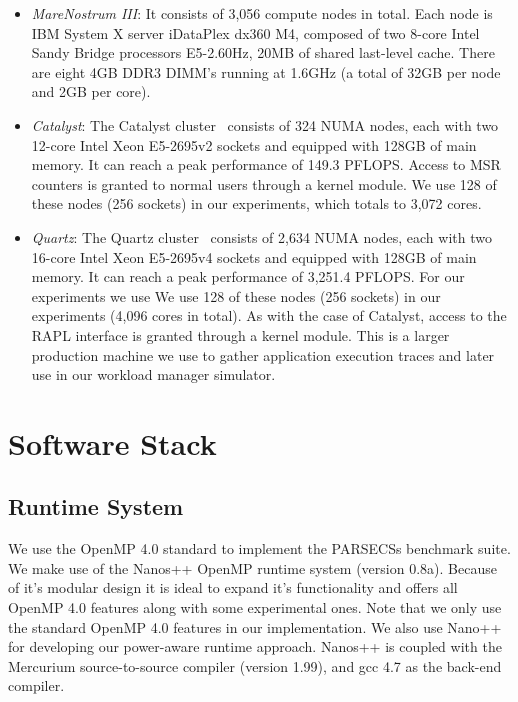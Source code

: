 \begin{itemize}
	\item \emph{MareNostrum III}: It consists of 3,056 compute nodes in total. Each node is
IBM System X server iDataPlex dx360 M4, composed of two 8-core Intel Sandy Bridge
processors E5-2.60Hz, 20MB of shared last-level cache. There are eight 4GB DDR3 DIMM's
running at 1.6GHz (a total of 32GB per node and 2GB per core). 

	\item \emph{Catalyst}: The Catalyst cluster~\cite{llnlconfluence} consists of 324 NUMA
nodes, each with two 12-core Intel Xeon E5-2695v2 sockets and equipped with 128GB of main
memory.  It can reach a peak performance of 149.3 PFLOPS.  Access to MSR counters is
granted to normal users through a kernel module.  We use 128 of these nodes (256 sockets)
in our experiments, which totals to 3,072 cores.

	\item \emph{Quartz}: The Quartz cluster~\cite{llnlconfluence} consists of 2,634 NUMA
nodes, each with two 16-core Intel Xeon E5-2695v4 sockets and equipped with 128GB of main
memory.  It can reach a peak performance of 3,251.4 PFLOPS.  For our experiments we use We
use 128 of these nodes (256 sockets) in our experiments (4,096 cores in total).  As with
the case of Catalyst, access to the RAPL interface is granted through a kernel module.
This is a larger production machine we use to gather application execution traces and later
use in our workload manager simulator.

\end{itemize}

\section{Software Stack}

\subsection{Runtime System}
We use the OpenMP 4.0 standard to implement the PARSECSs benchmark suite.  We make use of
the Nanos++ OpenMP runtime system (version 0.8a).  Because of it's modular design it is
ideal to expand it's functionality and offers all OpenMP 4.0 features along with some
experimental ones.  Note that we only use the standard OpenMP 4.0 features in our
implementation.  We also use Nano++ for developing our power-aware runtime approach.
Nanos++ is coupled with the Mercurium source-to-source compiler (version 1.99), and gcc
4.7 as the back-end compiler.  

